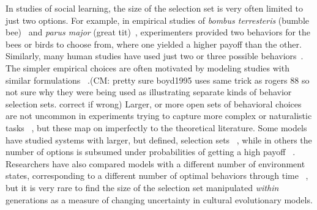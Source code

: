 \documentclass[letterpaper,11.5pt]{scrartcl}
\newcommand{\cm}[1]{{\textcolor{mypurple} {({\tiny CM:} #1)}}}
\begin{document}
In studies of social learning, the size of the selection set is very often limited to just two options. 
For example, in empirical studies of \emph{bombus terresteris} (bumble bee)~\cite{Baracchi2018} and \emph{parus major} (great tit)~\cite{Aplin2017}, experimenters provided two behaviors for
the bees or birds to choose from, where one yielded a higher payoff than the other. %
Similarly, many human studies have used just two
or three possible behaviors~\cite{McElreath2005,Toyokawa2019}. The simpler empirical choices are often motivated by modeling studies with similar formulations ~\cite{boyd1995does, Rogers1988,perreault2012bayesian}.\cm{pretty sure boyd1995 uses same trick as rogers 88 so not sure why they were being used as illustrating separate kinds of behavior selection sets. correct if wrong} Larger, or more open sets of behavioral choices are not uncommon in experiments trying to capture more complex or naturalistic tasks ~\cite{derex2013, wasielewski2014}, but these map on imperfectly to the theoretical literature. Some models have studied systems with larger, but defined, selection sets ~\cite{Rendell2010}, while in others the number of options is subsumed under probabilities of getting a high payoff ~\cite{Enquist2007}. Researchers have also compared models with a different number of environment states, corresponding to a different number of optimal behaviors through time ~\cite{Feldman1996}, but it is very rare to find the size of the selection set manipulated \emph{within} generations as a measure of changing uncertainty in cultural evolutionary models.
\end{document}
